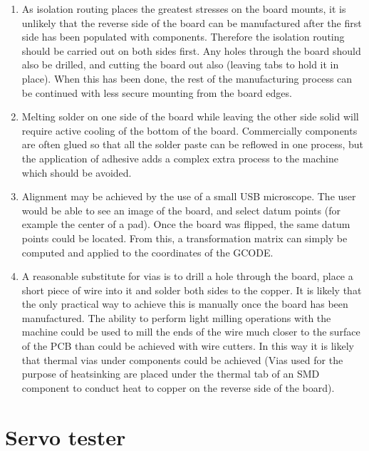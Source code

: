\begin{enumerate}
	\item	As isolation routing places the greatest stresses on the board mounts, it is unlikely that the reverse side of the board can be manufactured
			after the first side has been populated with components. Therefore the isolation routing should be carried out on both sides first. Any holes
			through the board should also be drilled, and cutting the board out also (leaving tabs to hold it in place). When this has been done, the
			rest of the manufacturing process can be continued with less secure mounting from the board edges.
	\item	Melting solder on one side of the board while leaving the other side solid will require active cooling of the bottom of the board. Commercially
			components are often glued so that all the solder paste can be reflowed in one process, but the application of adhesive adds a complex extra
			process to the machine which should be avoided.
	\item	Alignment may be achieved by the use of a small USB microscope. The user would be able to see an image of the board, and select datum points (for
			example the center of a pad). Once the board was flipped, the same datum points could be located. From this, a transformation matrix can simply
			be computed and applied to the coordinates of the GCODE.
	\item	A reasonable substitute for vias is to drill a hole through the board, place a short piece of wire into it and solder both sides to the copper.
			It is likely that the only practical way to achieve this is manually once the board has been manufactured. The ability to perform light milling
			operations with the machine could be used to mill the ends of the wire much closer to the surface of the PCB than could be achieved with wire cutters.
			In this way it is likely that thermal vias under components could be achieved (Vias used for the purpose of heatsinking are placed under the thermal
			tab of an SMD component to conduct heat to copper on the reverse side of the board).
\end{enumerate}

\newpage
\appendix
\appendixpage
\addappheadtotoc
\section{Servo tester}

